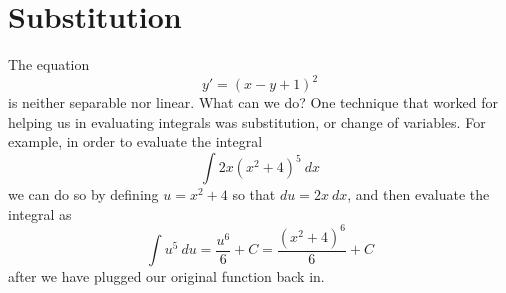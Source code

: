 \section{Substitution}
\label{substitution:section}




The equation
\begin{equation*}
y' = {(x-y+1)}^2 
\end{equation*}
is neither separable nor linear.  What can we do? One technique that worked for helping us in evaluating integrals was substitution, or change of variables. For example, in order to evaluate the integral
\begin{equation*}
\int 2x(x^2 + 4)^5 \ dx
\end{equation*} we can do so by defining $u = x^2 + 4$ so that $du = 2x\ dx$, and then evaluate the integral as 
\begin{equation*}
\int u^5\ du = \frac{u^6}{6} + C = \frac{(x^2 + 4)^6}{6} + C
\end{equation*} after we have plugged our original function back in.

